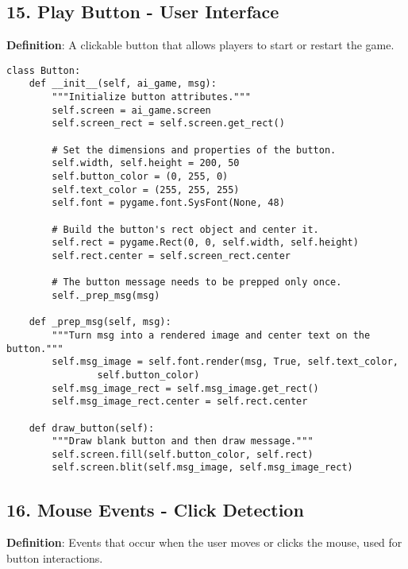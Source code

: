 \subsection*{15. Play Button - User Interface}
\textbf{Definition}: A clickable button that allows players to start or restart the game.

\begin{lstlisting}
class Button:
    def __init__(self, ai_game, msg):
        """Initialize button attributes."""
        self.screen = ai_game.screen
        self.screen_rect = self.screen.get_rect()
        
        # Set the dimensions and properties of the button.
        self.width, self.height = 200, 50
        self.button_color = (0, 255, 0)
        self.text_color = (255, 255, 255)
        self.font = pygame.font.SysFont(None, 48)
        
        # Build the button's rect object and center it.
        self.rect = pygame.Rect(0, 0, self.width, self.height)
        self.rect.center = self.screen_rect.center
        
        # The button message needs to be prepped only once.
        self._prep_msg(msg)
    
    def _prep_msg(self, msg):
        """Turn msg into a rendered image and center text on the button."""
        self.msg_image = self.font.render(msg, True, self.text_color,
                self.button_color)
        self.msg_image_rect = self.msg_image.get_rect()
        self.msg_image_rect.center = self.rect.center
    
    def draw_button(self):
        """Draw blank button and then draw message."""
        self.screen.fill(self.button_color, self.rect)
        self.screen.blit(self.msg_image, self.msg_image_rect)
\end{lstlisting}

\subsection*{16. Mouse Events - Click Detection}
\textbf{Definition}: Events that occur when the user moves or clicks the mouse, used for button interactions.

